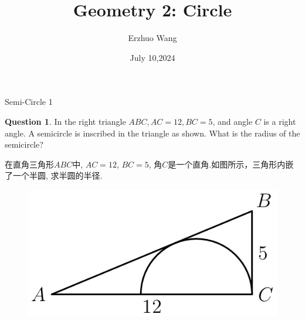 \documentclass{beamer}
\title{Geometry 2: Circle}
\institute{Youth STEM Academy}
\author{Erzhuo Wang}
\date{July 10,2024}
\theoremstyle{definition}
\newtheorem{ques}[defn]{Question}
\begin{document}
\begin{frame}
    \titlepage
\end{frame}
\begin{frame}{Semi-Circle 1}
    \begin{ques}
        In the right triangle $A B C, A C=12, B C=5$, and angle $C$ is a right angle. A semicircle is inscribed in the triangle as shown. What is the radius of the semicircle?

        在直角三角形$ABC$中, $A C=12$, $BC=5$, 角$C$是一个直角.如图所示，三角形内嵌了一个半圆, 求半圆的半径.
    \end{ques}
    \begin{figure}
        \includegraphics[height=0.4\textheight]{triangle4.png}
    \end{figure}
\end{frame}
\end{document}
